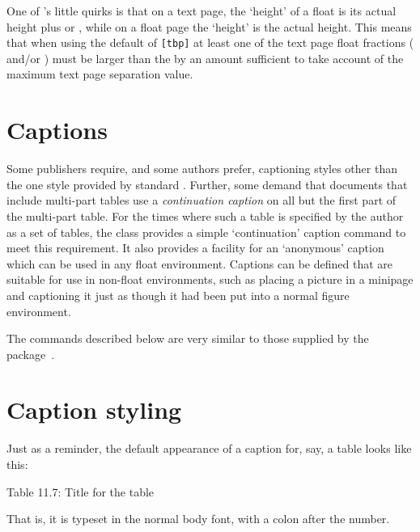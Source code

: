     One of \ltx's little quirks is that on a text page, the `height' of 
a float is its actual height plus \lnc{\textfloatsep} or \lnc{\floatsep}, 
while on a float page the `height' is the actual height. This means that 
when using the default  of \verb?[tbp]? at least one of the text 
page float fractions (\cmd{\topfraction} and/or \cmd{\bottomfraction}) 
must be larger than the \cmd{\floatpagefraction} by an amount sufficient 
to take account of the maximum text page separation value.
 


\section{Captions}


 Some publishers require, and some authors prefer, captioning styles
other than the one style provided by standard \ltx. 
Further, some demand that documents that include multi-part
tables use a \textit{continuation caption} on all but the first
part of the multi-part table. For the times where such 
a table is specified by the author as a set of 
tables, the class provides a simple `continuation' 
caption command to meet this 
requirement. It also provides a facility for an `anonymous' 
caption
which can be used in any float environment. 
Captions can be defined that are suitable for use in non-float
environments, such as placing a picture in a minipage and captioning
it just as though it had been put into a normal 
figure environment.

    The commands described below are very similar to
those supplied by the  package~\cite{CCAPTION}.

\section{Caption styling} 


    Just as a reminder, the default appearance of a caption for, say,
a table looks like this:
\begin{center}
Table 11.7: Title for the table
\end{center}
That is, it is typeset in the normal body font, with a colon after
the number.

